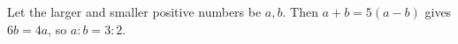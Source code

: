 Let the larger and smaller positive numbers be $a,b$. Then $a+b=5(a-b)$ gives $6b=4a$, so $\boxed{a:b=3:2}$.

